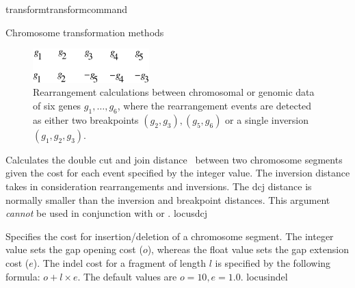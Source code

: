 \begin{command}{transform}{transformcommand}
\begin{arguments}
\begin{argumentgroup}{Chromosome transformation methods}
		    \begin{figure}[!htbp]
		        \begin{center}
        		    \includegraphics[width=0.4\textwidth]{doc/figures/breakpointDis.pdf}
      		    \end{center}
		        \caption{Rearrangement calculations between chromosomal or genomic data of six genes $g_1, \ldots, g_6$,
                    where the rearrangement events are detected as either two breakpoints $(g_2, g_3), (g_5, g_6)$
                    or a single inversion $(g_1, g_2, g_3)$.}
                \label{fig:distance}
		    \end{figure}
		
	        \begin{description}                 
                            
                    {Calculates the double cut and join
                    distance~\cite{yancopoulosetal2005}
                    between two chromosome segments given the cost for each
                    event specified by the integer value. The inversion distance
                    takes in consideration rearrangements and
                    inversions. The dcj distance is normally smaller than
                    the inversion and breakpoint distances.
                    This argument \emph{cannot} be used in conjunction with
                     or
                    .} 
                    {locusdcj}
                        
                    {Specifies the cost for insertion/deletion of a
                    chromosome segment. The integer value sets the gap opening
                    cost ($o$), whereas the float value sets the gap extension
                    cost ($e$).  The indel cost for a fragment of length $l$ is
                    specified by the following formula:
                        $o + l \times e$. The default values are $o=10, e=1.0$.}
                    {locusindel}
                        

\end{description}
\end{argumentgroup}
\end{arguments}
\end{command}
